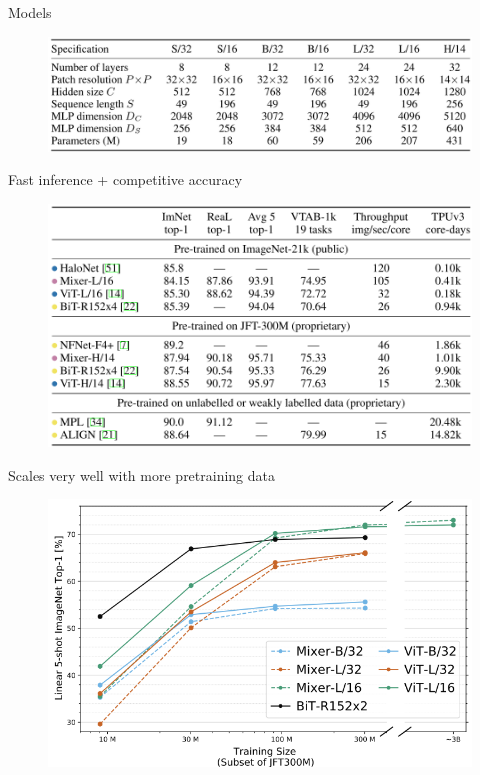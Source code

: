 \documentclass{beamer}
\begin{document}
\begin{frame}{Models}

\begin{figure}[h]
\includegraphics[width=\textwidth]{img/models}
\end{figure}

\end{frame}
\begin{frame}{Fast inference + competitive accuracy}

\begin{figure}[h]
\includegraphics[width=\textwidth]{img/stats}
\end{figure}

\end{frame}
\begin{frame}{Scales very well with more pretraining data}

\begin{figure}[h]
\includegraphics[width=\textwidth]{img/scaling}
\end{figure}

\end{frame}
\end{document}

